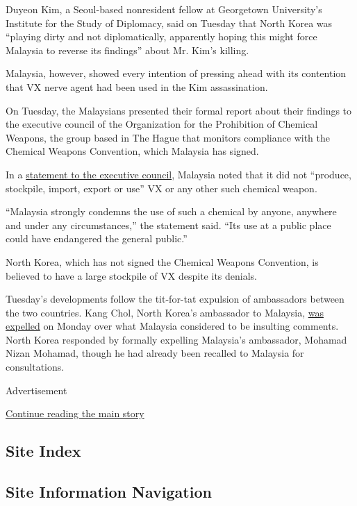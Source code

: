 Duyeon Kim, a Seoul-based nonresident fellow at Georgetown University's
Institute for the Study of Diplomacy, said on Tuesday that North Korea
was ``playing dirty and not diplomatically, apparently hoping this might
force Malaysia to reverse its findings'' about Mr. Kim's killing.

Malaysia, however, showed every intention of pressing ahead with its
contention that VX nerve agent had been used in the Kim assassination.

On Tuesday, the Malaysians presented their formal report about their
findings to the executive council of the Organization for the
Prohibition of Chemical Weapons, the group based in The Hague that
monitors compliance with the Chemical Weapons Convention, which Malaysia
has signed.

In a
\href{https://www.opcw.org/fileadmin/OPCW/EC/84/en/Malaysia_ec84_statement.pdf}{statement
to the executive council}, Malaysia noted that it did not ``produce,
stockpile, import, export or use'' VX or any other such chemical weapon.

``Malaysia strongly condemns the use of such a chemical by anyone,
anywhere and under any circumstances,'' the statement said. ``Its use at
a public place could have endangered the general public.''

North Korea, which has not signed the Chemical Weapons Convention, is
believed to have a large stockpile of VX despite its denials.

Tuesday's developments follow the tit-for-tat expulsion of ambassadors
between the two countries. Kang Chol, North Korea's ambassador to
Malaysia,
\href{https://www.nytimes3xbfgragh.onion/2017/03/06/world/asia/vx-north-korea-kim-jong-nam.html}{was
expelled} on Monday over what Malaysia considered to be insulting
comments. North Korea responded by formally expelling Malaysia's
ambassador, Mohamad Nizan Mohamad, though he had already been recalled
to Malaysia for consultations.

Advertisement

\protect\hyperlink{after-bottom}{Continue reading the main story}

\hypertarget{site-index}{%
\subsection{Site Index}\label{site-index}}

\hypertarget{site-information-navigation}{%
\subsection{Site Information
Navigation}\label{site-information-navigation}}


